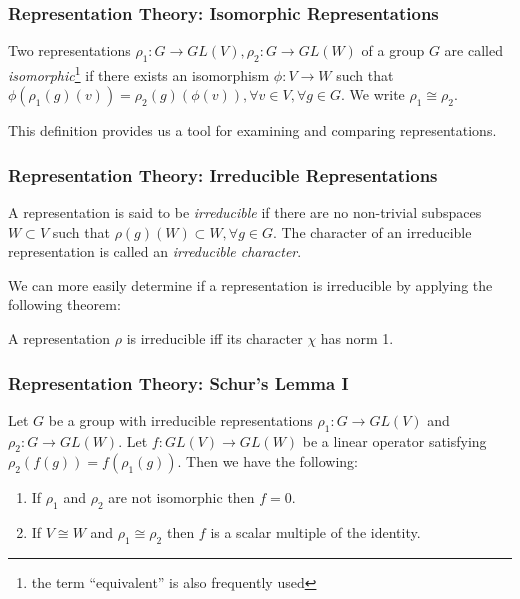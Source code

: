 \documentclass{beamer}
\newcommand{\iso}{\cong}
\begin{document}
\begin{frame}
\frametitle{Representation Theory: Isomorphic Representations}
        \begin{definition}\label{def:isomorphic_representations}
            Two representations $\rho_1: G \to GL(V), \rho_2: G \to GL(W)$ of a group $G$ are called \textit{isomorphic}\footnote{the term ``equivalent'' is also frequently used} if there exists an isomorphism $\phi: V \to W$ such that $\phi(\rho_1(g)(v)) = \rho_2(g)(\phi(v)), \forall v \in V, \forall g \in G$.
            We write $\rho_1 \iso \rho_2$.
        \end{definition}
        This definition provides us a tool for examining and comparing representations.
\end{frame}

\begin{frame}
\frametitle{Representation Theory: Irreducible Representations}
        \begin{definition}\label{def:irrep}
            A representation is said to be \textit{irreducible} if there are no non-trivial subspaces $W \subset V$ such that $\rho(g)(W) \subset W, \forall g \in G$. The character of an irreducible representation is called an \textit{irreducible character}.
        \end{definition}

        We can more easily determine if a representation is irreducible by applying the following theorem:
        \begin{theorem}\label{thm:irreducible_characters_are_normal}
            A representation $\rho$ is irreducible iff its character $\chi$ has norm 1.
        \end{theorem}
\end{frame}

\begin{frame}
\frametitle{Representation Theory: Schur's Lemma I}
        \begin{theorem}\label{thm:schurs_lemma}
            Let $G$ be a group with irreducible representations $\rho_1: G \to GL(V)$ and $\rho_2: G \to GL(W)$.
            Let $f: GL(V) \to GL(W)$ be a linear operator satisfying $\rho_2(f(g)) = f(\rho_1(g))$.
            Then we have the following:
                \begin{enumerate}
                \item If $\rho_1$ and $\rho_2$ are not isomorphic then $f = 0$.
                \item If $V \iso W$ and $\rho_1 \iso \rho_2$ then $f$ is a scalar multiple of the identity.
                \end{enumerate}
        \end{theorem}
\end{frame}
\end{document}
